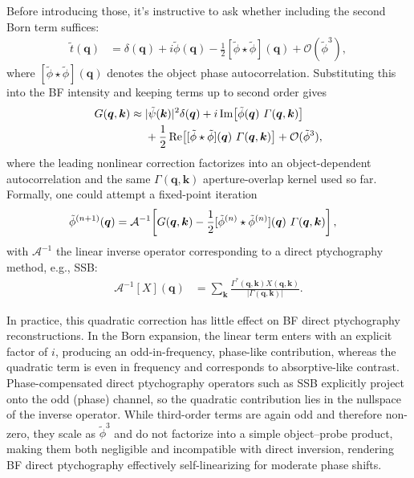 \documentclass[pdflatex,sn-aps,iicol]{sn-jnl}%
\begin{document}
Before introducing those, it's instructive to ask whether including the second Born term suffices:
\begin{align}
\tilde{t}(\boldsymbol{q})
&=
\delta(\boldsymbol{q})
+ i \tilde{\phi}(\boldsymbol{q})
- \frac{1}{2} [\tilde{\phi} \star \tilde{\phi}](\boldsymbol{q})
+ \mathcal{O}(\tilde{\phi}^3),
\end{align}
where $[\tilde{\phi} \star \tilde{\phi}](\boldsymbol{q})$ denotes the object phase autocorrelation.
Substituting this into the BF intensity and keeping terms up to second order gives
\begin{align}
G(\boldsymbol{q},\boldsymbol{k})
\approx\;&
\lvert \tilde{\psi}(\boldsymbol{k}) \rvert^2 \delta(\boldsymbol{q}) +
i \operatorname{Im}\!\left[\tilde{\phi}(\boldsymbol{q}) \,\thinspace \Gamma(\boldsymbol{q},\boldsymbol{k})\right]
\nonumber\\
&+
\frac{1}{2}
\operatorname{Re}\!\left[[\tilde{\phi} \star \tilde{\phi}](\boldsymbol{q}) \,\thinspace \Gamma(\boldsymbol{q},\boldsymbol{k})\right]
+
\mathcal{O}(\tilde{\phi}^3),
\label{eq:beyond-wpoa}
\end{align}
where the leading nonlinear correction factorizes into an object-dependent autocorrelation and the same $\Gamma(\boldsymbol{q},\boldsymbol{k})$ aperture-overlap kernel used so far.
Formally, one could attempt a fixed-point iteration
\begin{align}
\tilde{\phi}^{(n+1)}(\boldsymbol{q})
&=
\mathcal{A}^{-1}\!\left[
G(\boldsymbol{q},\boldsymbol{k})
-
\frac{1}{2}
[\tilde{\phi}^{(n)} \star \tilde{\phi}^{(n)}](\boldsymbol{q})
\,\thinspace
\Gamma(\boldsymbol{q},\boldsymbol{k})
\right],
\end{align}
with $\mathcal{A}^{-1}$ the linear inverse operator corresponding to a direct ptychography method, e.g., SSB:
\begin{align}
\mathcal{A}^{-1}[X](\boldsymbol{q})
&=
\sum_{\boldsymbol{k}}
\frac{
\Gamma^{*}(\boldsymbol{q},\boldsymbol{k}) X(\boldsymbol{q},\boldsymbol{k})
}{
\lvert \Gamma(\boldsymbol{q},\boldsymbol{k}) \rvert
}.
\end{align}

In practice, this quadratic correction has little effect on BF direct ptychography reconstructions.
In the Born expansion, the linear term enters with an explicit factor of $i$, producing an odd-in-frequency, phase-like contribution, whereas the quadratic term is even in frequency and corresponds to absorptive-like contrast.
Phase-compensated direct ptychography operators such as SSB explicitly project onto the odd (phase) channel, so the quadratic contribution lies in the nullspace of the inverse operator.
While third-order terms are again odd and therefore non-zero, they scale as $\tilde{\phi}^3$ and do not factorize into a simple object–probe product, making them both negligible and incompatible with direct inversion, rendering BF direct ptychography effectively self-linearizing for moderate phase shifts.
\end{document}
